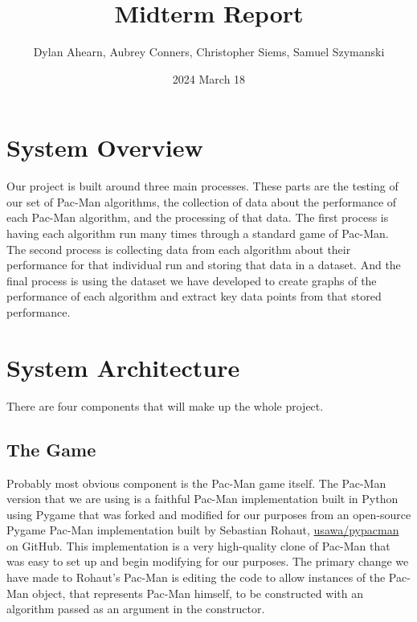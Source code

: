 \documentclass[12pt]{article}
\title{Midterm Report}
\author{Dylan Ahearn, Aubrey Conners, Christopher Siems, Samuel Szymanski}
\date{2024 March 18}
\begin{document}
  \parindent=0pt
  \parskip=6pt
  \maketitle
  \onehalfspacing
  \section*{System Overview}
    Our project is built around three main processes. These parts are the testing of our set of Pac-Man algorithms, the collection of data about the performance of each Pac-Man algorithm, and the processing of that data. The first process is having each algorithm run many times through a standard game of Pac-Man. The second process is collecting data from each algorithm about their performance for that individual run and storing that data in a dataset. And the final process is using the dataset we have developed to create graphs of the performance of each algorithm and extract key data points from that stored performance.
  \section*{System Architecture}
    There are four components that will make up the whole project.  
    \subsection*{The Game}
      Probably most obvious component is the Pac-Man game itself. The Pac-Man version that we are using is a faithful Pac-Man implementation built in Python using Pygame that was forked and modified for our purposes from an open-source Pygame Pac-Man implementation built by Sebastian Rohaut, \href{https://github.com/usawa/pypacman}{usawa/pypacman} on GitHub. This implementation is a very high-quality clone of Pac-Man that was easy to set up and begin modifying for our purposes. The primary change we have made to Rohaut's Pac-Man is editing the code to allow instances of the Pac-Man object, that represents Pac-Man himself, to be constructed with an algorithm passed as an argument in the constructor. 
\end{document}
